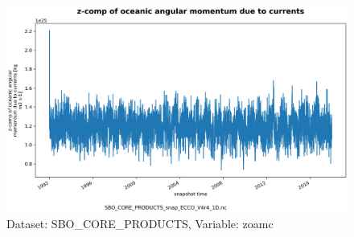 \begin{figure}[H]
\centering
\includegraphics[scale=0.55]{../images/plots/oneD_plots/SBO_Core_Products/zoamc.png}
\caption{Dataset: SBO\_CORE\_PRODUCTS, Variable: zoamc}
\label{tab:table-SBO_CORE_PRODUCTS_zoamc-Plot}
\end{figure}
\newpage
\pagebreak

